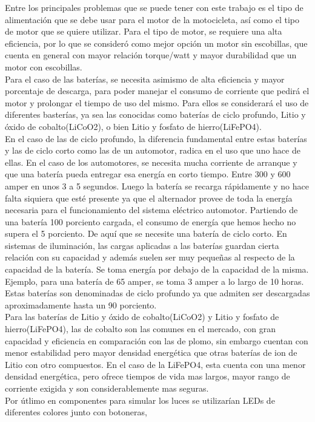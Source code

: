 \documentclass[letterpaper]{article}
\begin{document}
Entre los principales problemas que se puede tener con este trabajo es el tipo de alimentación que se debe usar para el motor de la motocicleta, así como el tipo de motor que se quiere utilizar. Para el tipo de motor, se requiere una alta eficiencia, por lo que se consideró como mejor opción un motor sin escobillas, que cuenta en general con mayor relación torque/watt y mayor durabilidad que un motor con escobillas. \\
Para el caso de las baterías, se necesita asimismo de alta eficiencia y mayor porcentaje de descarga, para poder manejar el consumo de corriente que pedirá el motor y prolongar el tiempo de uso del mismo. Para ellos se considerará el uso de diferentes basterías, ya sea las conocidas como baterías de ciclo profundo, Litio y óxido de cobalto(LiCoO2), o bien Litio y fosfato de hierro(LiFePO4). \\
En el caso de las de ciclo profundo, la diferencia fundamental entre estas baterías y las de ciclo corto como las de un automotor, radica en el uso que uno hace de ellas. En el caso de los automotores, se necesita  mucha  corriente de arranque y que una batería pueda entregar esa energía en corto tiempo. 
Entre 300 y 600 amper en unos 3 a 5 segundos. Luego la batería se recarga rápidamente y no hace falta siquiera que esté presente ya que el alternador provee de toda la energía necesaria para el funcionamiento del sistema eléctrico automotor. Partiendo de una batería 100 porciento cargada, el consumo de energía que hemos hecho no supera el 5 porciento. 
De aquí que se necesite una batería de ciclo corto. En sistemas de iluminación, las cargas aplicadas a las baterías guardan cierta relación con su capacidad y además suelen 
ser muy pequeñas al respecto de la  capacidad  de  la batería. Se toma energía por debajo de la capacidad de la misma.  Ejemplo, para una batería de 65  amper, se toma 3 amper a lo largo de 10 horas. Estas baterías son denominadas de ciclo profundo ya que admiten ser descargadas aproximadamente hasta un 90 porciento. \\
Para las baterías de Litio y óxido de cobalto(LiCoO2) y Litio y fosfato de hierro(LiFePO4), las de cobalto son las comunes en el mercado, con gran capacidad y eficiencia en comparación con las de plomo, sin embargo cuentan con menor estabilidad pero mayor densidad energética que otras baterías de ion de Litio con otro compuestos. En el caso de la LiFePO4, esta cuenta con una menor densidad energética, pero ofrece tiempos de vida mas largos, mayor rango de corriente exigida y son considerablemente mas seguras.\\
Por útlimo en componentes para simular los luces se utilizarían LEDs de diferentes colores junto con botoneras,
\end{document}
